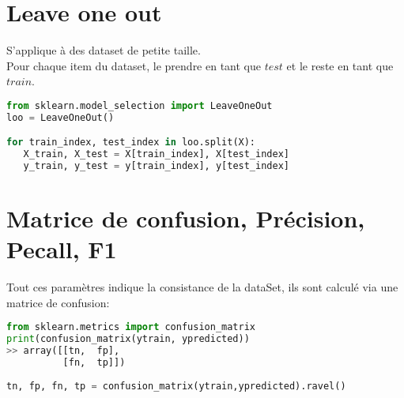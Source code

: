 
\section{Leave one out}
S'applique à des dataset de petite taille.\\
Pour chaque item du dataset, le prendre en tant que $test$ et le reste en tant que $train$.\\

\lstset{style=mlpythoncode}
\begin{lstlisting}[language=Python]
from sklearn.model_selection import LeaveOneOut
loo = LeaveOneOut()

for train_index, test_index in loo.split(X):
   X_train, X_test = X[train_index], X[test_index]
   y_train, y_test = y[train_index], y[test_index]
\end{lstlisting}


\pagebreak

\section{Matrice de confusion, Précision, Pecall, F1}
Tout ces paramètres indique la consistance de la dataSet, ils sont calculé via une matrice de confusion:\\
\lstset{style=mlpythoncode}
\begin{lstlisting}[language=Python]
from sklearn.metrics import confusion_matrix
print(confusion_matrix(ytrain, ypredicted))
>> array([[tn,  fp],
          [fn,  tp]])
          
tn, fp, fn, tp = confusion_matrix(ytrain,ypredicted).ravel()
\end{lstlisting}

